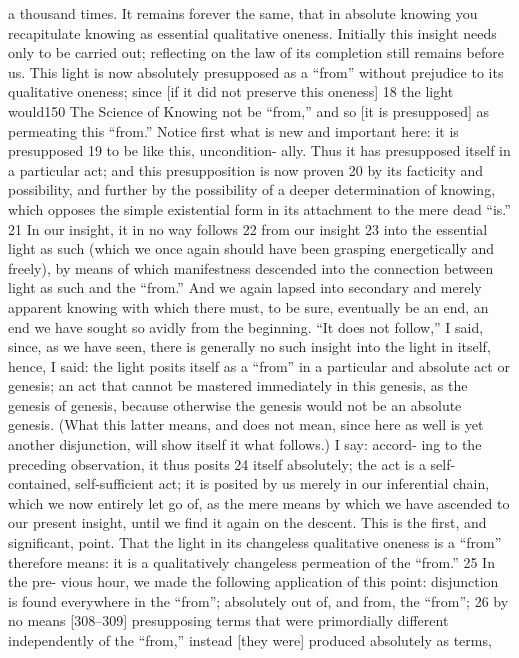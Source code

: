 a thousand times. It remains forever the same, that in absolute knowing you
recapitulate knowing as essential qualitative oneness. Initially this insight needs
only to be carried out; reflecting on the law of its completion still remains before
us. This light is now absolutely presupposed as a “from” without prejudice to its
qualitative oneness; since [if it did not preserve this oneness] 18 the light would150
The Science of Knowing
not be “from,” and so [it is presupposed] as permeating this “from.” Notice first
what is new and important here: it is presupposed 19 to be like this, uncondition-
ally. Thus it has presupposed itself in a particular act; and this presupposition
is now proven 20 by its facticity and possibility, and further by the possibility of
a deeper determination of knowing, which opposes the simple existential form
in its attachment to the mere dead “is.” 21
In our insight, it in no way follows 22 from our insight 23 into the essential
light as such (which we once again should have been grasping energetically
and freely), by means of which manifestness descended into the connection
between light as such and the “from.” And we again lapsed into secondary and
merely apparent knowing with which there must, to be sure, eventually be an
end, an end we have sought so avidly from the beginning. “It does not follow,”
I said, since, as we have seen, there is generally no such insight into the light
in itself, hence, I said: the light posits itself as a “from” in a particular and
absolute act or genesis; an act that cannot be mastered immediately in this
genesis, as the genesis of genesis, because otherwise the genesis would not be
an absolute genesis. (What this latter means, and does not mean, since here as
well is yet another disjunction, will show itself it what follows.) I say: accord-
ing to the preceding observation, it thus posits 24 itself absolutely; the act is a
self-contained, self-sufficient act; it is posited by us merely in our inferential
chain, which we now entirely let go of, as the mere means by which we have
ascended to our present insight, until we find it again on the descent. This is
the first, and significant, point.
That the light in its changeless qualitative oneness is a “from” therefore
means: it is a qualitatively changeless permeation of the “from.” 25 In the pre-
vious hour, we made the following application of this point: disjunction is
found everywhere in the “from”; absolutely out of, and from, the “from”; 26 by
no means [308–309] presupposing terms that were primordially different
independently of the “from,” instead [they were] produced absolutely as terms,
